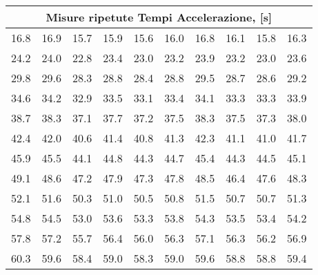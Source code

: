 \begin{tabular}{r r r r r r r r r r}
\hline
\multicolumn{ 10}{|c|}{Misure ripetute Tempi Accelerazione, \pm 0.1  [s]} \\ \hline
16.8 & 16.9 & 15.7 & 15.9 & 15.6 & 16.0 & 16.8 & 16.1 & 15.8 & 16.3 \\ \hline
24.2 & 24.0 & 22.8 & 23.4 & 23.0 & 23.2 & 23.9 & 23.2 & 23.0 & 23.6 \\ \hline
29.8 & 29.6 & 28.3 & 28.8 & 28.4 & 28.8 & 29.5 & 28.7 & 28.6 & 29.2 \\ \hline
34.6 & 34.2 & 32.9 & 33.5 & 33.1 & 33.4 & 34.1 & 33.3 & 33.3 & 33.9 \\ \hline
38.7 & 38.3 & 37.1 & 37.7 & 37.2 & 37.5 & 38.3 & 37.5 & 37.3 & 38.0 \\ \hline
42.4 & 42.0 & 40.6 & 41.4 & 40.8 & 41.3 & 42.3 & 41.1 & 41.0 & 41.7 \\ \hline
45.9 & 45.5 & 44.1 & 44.8 & 44.3 & 44.7 & 45.4 & 44.3 & 44.5 & 45.1 \\ \hline
49.1 & 48.6 & 47.2 & 47.9 & 47.3 & 47.8 & 48.5 & 46.4 & 47.6 & 48.3 \\ \hline
52.1 & 51.6 & 50.3 & 51.0 & 50.5 & 50.8 & 51.5 & 50.7 & 50.7 & 51.3 \\ \hline
54.8 & 54.5 & 53.0 & 53.6 & 53.3 & 53.8 & 54.3 & 53.5 & 53.4 & 54.2 \\ \hline
57.8 & 57.2 & 55.7 & 56.4 & 56.0 & 56.3 & 57.1 & 56.3 & 56.2 & 56.9 \\ \hline
60.3 & 59.6 & 58.4 & 59.0 & 58.3 & 59.0 & 59.6 & 58.8 & 58.8 & 59.4 \\ \hline
\end{tabular}

